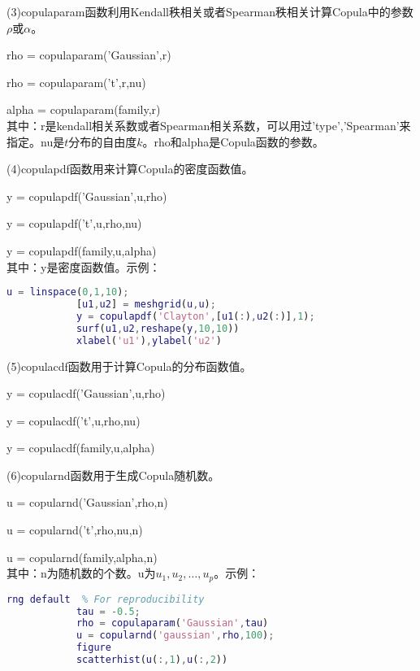             (3)copulaparam函数利用Kendall秩相关或者Spearman秩相关计算Copula中的参数$\rho$或$\alpha$。\par
            rho = copulaparam('Gaussian',r)\par
            rho = copulaparam('t',r,nu)\par
            alpha = copulaparam(family,r)\\
            其中：r是kendall相关系数或者Spearman相关系数，可以用过'type','Spearman'来指定。nu是$t$分布的自由度$k$。rho和alpha是Copula函数的参数。
            \par
            (4)copulapdf函数用来计算Copula的密度函数值。
            \par
            y = copulapdf('Gaussian',u,rho)\par
            y = copulapdf('t',u,rho,nu)\par
            y = copulapdf(family,u,alpha)\\
            其中：y是密度函数值。示例：
            \begin{lstlisting}[language = Matlab]
            u = linspace(0,1,10);
            [u1,u2] = meshgrid(u,u);
            y = copulapdf('Clayton',[u1(:),u2(:)],1);
            surf(u1,u2,reshape(y,10,10))
            xlabel('u1'),ylabel('u2')
            \end{lstlisting}
            \par
            (5)copulacdf函数用于计算Copula的分布函数值。\par
            y = copulacdf('Gaussian',u,rho)\par
            y = copulacdf('t',u,rho,nu)\par
            y = copulacdf(family,u,alpha)\par
            (6)copularnd函数用于生成Copula随机数。\par
            u = copularnd('Gaussian',rho,n)\par
            u = copularnd('t',rho,nu,n)\par
            u = copularnd(family,alpha,n)\\
            其中：n为随机数的个数。u为$u_1,u_2,\dots,u_p$。示例：
            \begin{lstlisting}[language = Matlab]
            rng default  % For reproducibility
            tau = -0.5;
            rho = copulaparam('Gaussian',tau)
            u = copularnd('gaussian',rho,100);
            figure
            scatterhist(u(:,1),u(:,2))
            \end{lstlisting}


% 
